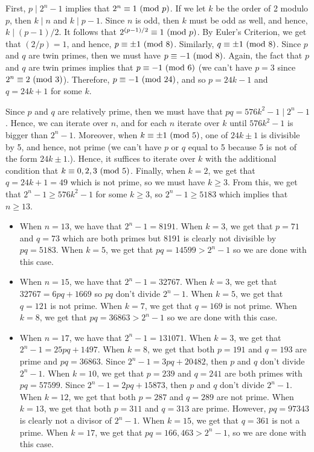 \begin{solution}
    First, $p \mid 2^n - 1$ implies that $2^n \equiv 1 \ (\mathrm{mod}\ p)$. If we let $k$ be the order of 2 modulo $p$, then $k \mid n$ and $k \mid p-1$. Since $n$ is odd, then $k$ must be odd as well, and hence, $k \mid (p-1)/2$. It follows that $2^{(p-1)/2} \equiv 1 \ (\mathrm{mod}\ p)$. By Euler's Criterion, we get that $(2/p) = 1$, and hence, $p \equiv \pm 1 \ (\mathrm{mod}\ 8)$. Similarly, $q \equiv \pm 1 \ (\mathrm{mod}\ 8)$. Since $p$ and $q$ are twin primes, then we must have $p \equiv -1 \ (\mathrm{mod}\ 8)$. Again, the fact that $p$ and $q$ are twin primes implies that $p \equiv -1 \ (\mathrm{mod}\ 6)$ (we can't have $p = 3$ since $2^n \equiv 2 \ (\mathrm{mod}\ 3)$). Therefore, $p \equiv -1 \ (\mathrm{mod}\ 24)$, and so $p = 24k - 1$ and $q = 24k + 1$ for some $k$.
    
    Since $p$ and $q$ are relatively prime, then we must have that $pq = 576k^2 - 1 \mid 2^n - 1$. Hence, we can iterate over $n$, and for each $n$ iterate over $k$ until $576k^2 - 1$ is bigger than $2^n - 1$. Moreover, when $k \equiv \pm 1 \ (\mathrm{mod}\ 5)$, one of $24k \pm 1$ is divisible by 5, and hence, not prime (we can't have $p$ or $q$ equal to 5 because 5 is not of the form $24k \pm 1$.). Hence, it suffices to iterate over $k$ with the additional condition that $k \equiv 0,2,3 \ (\mathrm{mod}\ 5)$. Finally, when $k = 2$, we get that $q = 24k + 1 = 49$ which is not prime, so we must have $k \geq 3$. From this, we get that $2^n - 1 \geq 576k^2 - 1$ for some $k \geq 3$, so $2^n - 1 \geq 5183$ which implies that $n \geq 13$.
    \begin{itemize}
        \item When $n = 13$, we have that $2^n - 1 = 8191$. When $k = 3$, we get that $p = 71$ and $q = 73$ which are both primes but 8191 is clearly not divisible by $pq = 5183$. When $k = 5$, we get that $pq = 14599 > 2^n - 1$ so we are done with this case.
        \item When $n = 15$, we have that $2^n - 1 = 32767$. When $k = 3$, we get that $32767 = 6pq + 1669$ so $pq$ don't divide $2^n - 1$. When $k = 5$, we get that $q = 121$ is not prime. When $k = 7$, we get that $q = 169$ is not prime. When $k = 8$, we get that $pq = 36863 > 2^n - 1$ so we are done with this case.
        \item When $n = 17$, we have that $2^n - 1 = 131071$. When $k = 3$, we get that $2^n - 1 = 25pq + 1497$. When $k = 8$, we get that both $p = 191$ and $q = 193$ are prime and $pq = 36863$. Since $2^n - 1 = 3pq + 20482$, then $p$ and $q$ don't divide $2^n - 1$. When $k = 10$, we get that $p = 239$ and $q = 241$ are both primes with $pq = 57599$. Since $2^n - 1 = 2pq + 15873$, then $p$ and $q$ don't divide $2^n - 1$. When $k = 12$, we get that both $p = 287$ and $q = 289$ are not prime. When $k = 13$, we get that both $p = 311$ and $q = 313$ are prime. However, $pq = 97343$ is clearly not a divisor of $2^n - 1$. When $k = 15$, we get that $q = 361$ is not a prime. When $k = 17$, we get that $pq = 166,463 > 2^n - 1$, so we are done with this case.

\end{itemize}
\end{solution}

